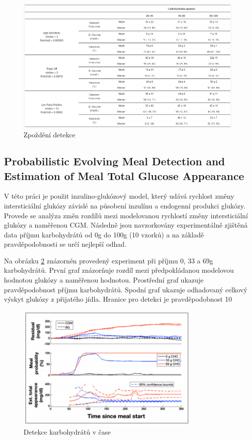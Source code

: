 \begin{figure}[H]
\caption{Zpoždění detekce}
\label{fig:crosscovariance3}
\includegraphics[width=1\textwidth]{img/analyza/crosscovariance3.png}
\end{figure}


\subsection{Probabilistic Evolving Meal Detection and Estimation of Meal Total Glucose Appearance \citep{Analyza.Diff}}
\label{ch:diff}

V této práci je použit inzulino-glukózový model, který udává rychlost změny intersticiální glukózy závislé na působení inzulínu a endogenní produkci glukózy. Provede se analýza změn rozdílů mezi modelovanou rychlostí změny intersticiální glukózy a naměřenou CGM. Následně jsou navzorkovány experimentálně zjištěná data příjmu karbohydrátů od 0g do 100g (10 vzorků) a na základě pravděpodobnosti se určí nejlepší odhad.

Na obrázku \ref{fig:diff1} znázorněn provedený experiment při příjmu 0, 33 a 69g karbohydrátů. První graf znázorňuje rozdíl mezi předpokládanou modelovou hodnotou glukózy a naměřenou hodnotou. Prostřední graf ukazuje pravděpodobnost příjmu karbohydrátů. Spodní graf ukazuje odhadovaný celkový výskyt glukózy z přijatého jídla. Hranice pro detekci je pravděpodobnost 10%

\begin{figure}[H]
\caption{Detekce karbohydrátů v čase}
\label{fig:diff1}
\includegraphics[width=0.8\textwidth]{img/analyza/diff1.png}
\end{figure}

